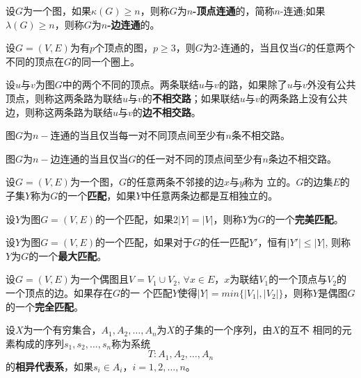     \begin{Def}
    设$G$为一个图，如果$\kappa (G) \geq n$，则称$G$为{\bfseries $n$-顶点连通}的，简称$n$-连通;如果$\lambda (G) \geq n$，则称$G$为{\bfseries $n$-边连通}的。
  \end{Def}

    \begin{Thm}
    设$G=(V,E)$为有$p$个顶点的图，$p \geq 3$，则$G$为2-连通的，当且仅当$G$的任意两个不同的顶点在$G$的同一个圈上。
  \end{Thm}
  \begin{Def}
    设$u$与$v$为图$G$中的两个不同的顶点。两条联结$u$与$v$的路，如果除了$u$与$v$外没有公共顶点，则称这两条路为联结$u$与$v$的{\bfseries 不相交路}；如果联结$u$与$v$的两条路上没有公共边，则称这两条路为联结$u$与$v$的{\bfseries 边不相交路}。
  \end{Def}
  \begin{Thm}
    图$G$为$n-$连通的当且仅当每一对不同顶点间至少有$n$条不相交路。
  \end{Thm}
  \begin{Thm}
    图$G$为$n-$边连通的当且仅当$G$的任一对不同的顶点间至少有$n$条边不相交路。
  \end{Thm}
    \begin{Def}
    设$G=(V,E)$为一个图，$G$的任意两条不邻接的边$x$与$y$称为{
      立}的。$G$的边集$E$的子集$Y$称为$G$的一个{\bfseries 匹配}，如果$Y$中任意两条边都是互相独立的。
  \end{Def}

    \begin{Def}
    设$Y$为图$G=(V,E)$的一个匹配，如果$2|Y|=|V|$，则称$Y$为$G$的一个{\bfseries 完美匹配}。
  \end{Def}

      \begin{Def}
   设$Y$为图$G=(V,E)$的一个匹配，如果对于$G$的任一匹配$Y'$，恒有$|Y'|\leq |Y|$, 则称$Y$为$G$的一个{\bfseries 最大匹配}。
  \end{Def}

    \begin{Def}
    设$G=(V,E)$为一个偶图且$V=V_1\cup V_2$,
    $\forall x \in
    E$，$x$为联结$V_1$的一个顶点与$V_2$的一个顶点的边。如果存在$G$的一
    个匹配$Y$使得$|Y|=min\{|V_1|,|V_2|\}$，则称$Y$是偶图$G$的一个{\bfseries 完全匹配}。
  \end{Def}

    \begin{Def}
    设$X$为一个有穷集合，$A_1,A_2,\ldots,A_n$为$X$的子集的一个序列，由$X$的互不
    相同的元素构成的序列$s_1,s_2,\ldots,s_n$称为系统\[T:A_1,A_2,\ldots,A_n\]的{\bfseries 相异代表系}，如果$s_i\in A_i$，$i=1,2,\ldots,n$。
  \end{Def}

